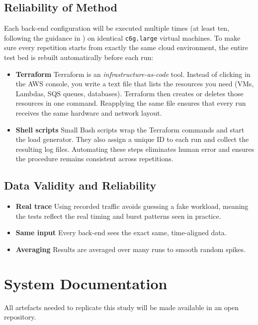 \documentclass[nomenclature, english, biblatex]{kththesis}
\numberwithin{listing}{chapter}
\begin{document}
\subsection{Reliability of Method}
Each back-end configuration will be executed multiple times (at least ten, following the guidance in \cite{Eismann2020MicroserviceBenchmark}) on identical \texttt{c6g.large} virtual machines.
To make sure every repetition starts from exactly the same cloud environment, the entire test bed is rebuilt automatically before each run:

\begin{itemize}[leftmargin=*]
  \item \textbf{Terraform}
        Terraform is an \emph{infrastructure-as-code} tool. Instead of clicking in the \gls{AWS} console, you write a text file that lists the resources you need (VMs, Lambdas, SQS queues, databases). Terraform then creates or deletes those resources in one command. Reapplying the same file ensures that every run receives the same hardware and network layout.
  \item \textbf{Shell scripts} 
        Small Bash scripts wrap the Terraform commands and start the load generator. They also assign a unique ID to each run and collect the resulting log files. Automating these steps eliminates human error and ensures the procedure remains consistent across repetitions.
\end{itemize}

\subsection{Data Validity and Reliability}
\begin{itemize}[leftmargin=*]
  \item \textbf{Real trace} Using recorded traffic avoids guessing a fake workload, meaning the tests reflect the real timing and burst patterns seen in practice.
  \item \textbf{Same input} Every back-end sees the exact same, time-aligned data. 
  \item \textbf{Averaging} Results are averaged over many runs to smooth random spikes. 
\end{itemize}


\section{System Documentation}
\label{sec:systemDocumentation}

All artefacts needed to replicate this study will be made available in an open repository.
\end{document}
